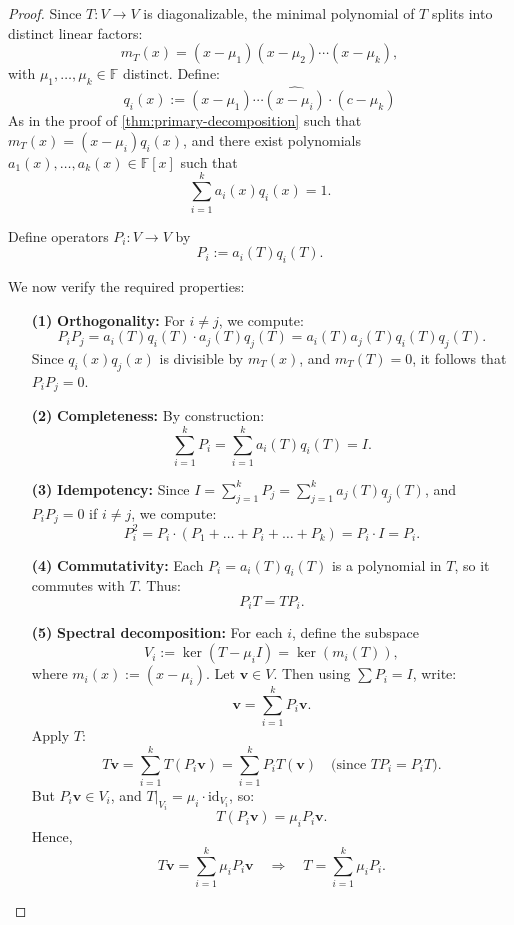 \begin{proof}
Since \(T : V \to V\) is diagonalizable, the minimal polynomial of \(T\) splits into distinct linear factors:
\[
m_T(x) = (x - \mu_1)(x - \mu_2) \cdots (x - \mu_k),
\]
with \(\mu_1, \ldots, \mu_k \in \mathbb{F}\) distinct. Define:
\[
q_i(x) := (x - \mu_1) \cdots \widehat{(x-\mu_i)} \cdot (c-\mu_k)
\]
As in the proof of \autoref{thm:primary-decomposition} such that $m_T(x) = (x - \mu_i) q_i(x)$, and there exist polynomials \(a_1(x), \ldots, a_k(x) \in \mathbb{F}[x]\) such that
\[
\sum_{i=1}^k a_i(x) q_i(x) = 1.
\]

Define operators \(P_i : V \to V\) by
\[
P_i := a_i(T) q_i(T).
\]

We now verify the required properties:
\begin{enumerate}
    \item[\textbf{(1)}] \textbf{Orthogonality:}  
    For \(i \ne j\), we compute:
    \[
    P_i P_j = a_i(T) q_i(T) \cdot a_j(T) q_j(T) = a_i(T) a_j(T) q_i(T) q_j(T).
    \]
    Since \(q_i(x) q_j(x)\) is divisible by \(m_T(x)\), and \(m_T(T) = 0\), it follows that $P_i P_j = 0$.

    \item[\textbf{(2)}] \textbf{Completeness:}  
    By construction:
    \[
    \sum_{i=1}^k P_i = \sum_{i=1}^k a_i(T) q_i(T) = I.
    \]
    \item[\textbf{(3)}] \textbf{Idempotency:} Since \(I = \sum_{j=1}^k P_j = \sum_{j=1}^k a_j(T) q_j(T)\), and $P_iP_j = 0$ if $i \neq j$, we compute:
    \[
    P_i^2 = P_i \cdot (P_1 + \dots +P_i + \dots +P_k) = P_i \cdot I = P_i.
    \]
    \item[\textbf{(4)}] \textbf{Commutativity:}  
    Each \(P_i = a_i(T) q_i(T)\) is a polynomial in \(T\), so it commutes with \(T\). Thus:
    \[
    P_i T = T P_i.
    \]

    \item[\textbf{(5)}] \textbf{Spectral decomposition:}  
    For each \(i\), define the subspace
    \[
    V_i := \ker(T - \mu_i I) = \ker( m_i(T)),
    \]
    where \(m_i(x) := (x - \mu_i)\). Let \(\mathbf{v} \in V\). Then using \(\sum P_i = I\), write:
    \[
    \mathbf{v} = \sum_{i=1}^k P_i \mathbf{v}.
    \]
    Apply \(T\):
    \[
    T \mathbf{v} = \sum_{i=1}^k T(P_i \mathbf{v}) = \sum_{i=1}^k P_i T(\mathbf{v}) \quad \text{(since } T P_i = P_i T\text{)}.
    \]
    But \(P_i \mathbf{v} \in V_i\), and \(T|_{V_i} = \mu_i \cdot \mathrm{id}_{V_i}\), so:
    \[
    T(P_i \mathbf{v}) = \mu_i P_i \mathbf{v}.
    \]
    Hence,
    \[
    T \mathbf{v} = \sum_{i=1}^k \mu_i P_i \mathbf{v} \quad \Rightarrow \quad T = \sum_{i=1}^k \mu_i P_i.
    \]
\end{enumerate}
\end{proof}

